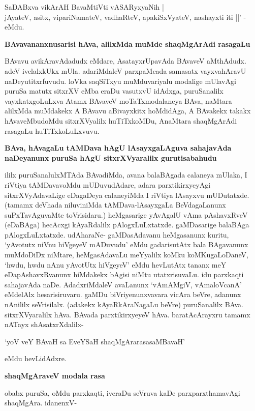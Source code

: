 \begin{shloka}
SaDABxva vikArAH BavaMtiVti vASARyxyaNih | \\
jAyateV, asitx, vipariNamateV, vadhaRteV, apakiSxVyateV, nashayxti iti ||' -eMdu.
\end{shloka}

{\bf BAvavananxnusarisi hAva, alilxMda muMde shaqMgArAdi rasagaLu}

BAvavu avikAravAdadudx eMdare, AsatayxrUpavAda BAvaveV aMthAdudx. adeV ivelalxkUkx mUla. adariMdaleV parxpaMcada samasatx vayxvahAravU naDeyutitxrfuvudu. loVka saqSiTxyu muMduvariyalu modalige mUlavAgi puruSa matutx sitxrXV eMba eraDu vasutxvU idAdxga, puruSanalilx vayxkatxgoLuLxva Atamx BAvaveV moTaTxmodalaneya BAva, naMtara alilxMda muMdakekx A BAvavu aBivayxkitx hoMdidAga, A BAvakekx takakx hAvaveMbudoMdu sitxrXVyalilx huTiTxkoMDu, AnaMtara shaqMgArAdi rasagaLu huTiTxkoLuLxvuvu.

{\bf BAva, hAvagaLu tAMDava hAgU lAsayxgaLAguva sahajavAda naDeyanunx puruSa hAgU sitxrXVyaralilx gurutisabahudu}

ililx puruSanalulxMTAda BAvadiMda, avana balaBAgada calaneya mUlaka, I riVtiya tAMDavavoMdu mUDuvudAdare, adara parxtikirxyeyAgi sitxrXVyAdavaLige eDagaDeya calaneyiMda I riVtiya lAsayxvu mUDutatxde. (tamamx deVhada niluviniMda tAMDava-lAsayxgaLa BeVdagaLanunx suPxTavAguvaMte toVrisidaru.) heMgasarige yAvAgalU vAma pAshavxRveV (eDaBAga) hecAcxgi kAyaRdalilx pAlogxLuLxtatxde. gaMDasarige balaBAga pAlogxLuLxtatxde. udAharaNe- gaMDasAdavanu heMgasanunx kuritu, `yAvotutx niVnu hiVgeyeV mADuvudu' eMdu gadarisutAtx bala BAgavanunx muMdoDiDx niMtare, heMgasAdavaLu meYyalilx koMku koMKugaLoDaneV, `hwdu, hwdu nAnu yAvotUtx hiVgeyeV' eMdu hevLutAtx tananx meY eDapAshavxRvanunx hiMdakekx bAgisi niMtu utatxrisuvaLu. idu parxkaqti sahajavAda naDe. AdadxriMdaleV avaLanunx `vAmAMgiV, vAmaloVcanA' eMdelAlx hesarisiruvaru. gaMDu biVriyenunxvavara vicAra beVre, adanunx nAnililx seVrisilalx. (adakekx kAyaRkAraNagaLu beVre) puruSanalilx BAva. sitxrXVyaralilx hAva. BAvada parxtikirxyeyeV hAva. baratAcArayxru tamamx nATayx shAsatxrXdalilx-

\begin{shloka} 
`yoV veY BAvaH sa EveYSaH shaqMgArarasasaMBavaH'
\end{shloka}

eMdu hevLidAdxre.

{\bf shaqMgAraveV modala rasa}

obabx puruSa, oMdu parxkaqti, iveraDu seVruva kaDe parxparxthamavAgi shaqMgAra. idanenxV-

